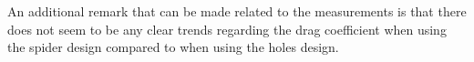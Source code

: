 





An additional remark that can be made related to the measurements is that there does not seem to be any clear trends regarding the drag coefficient when using the \gls{spider} design compared to when using the \gls{holes} design. 







